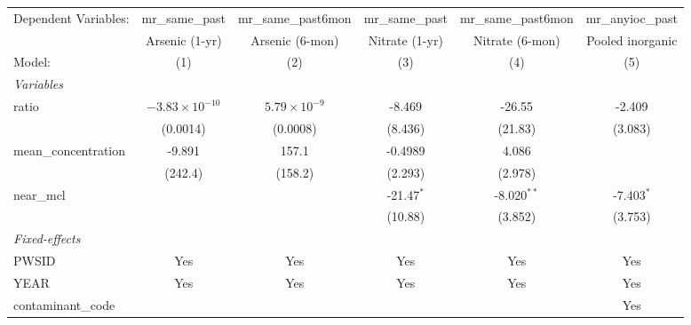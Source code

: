 \makeatletter
{}%
\makeatother

\begingroup
\centering
\begin{tabular}{lccccc}
   \tabularnewline \midrule \midrule
   Dependent Variables: & mr\_same\_past          & mr\_same\_past6mon    & mr\_same\_past   & mr\_same\_past6mon   & mr\_anyioc\_past\\    
                        & Arsenic (1-yr)          & Arsenic (6-mon)       & Nitrate (1-yr)   & Nitrate (6-mon)      & Pooled inorganic \\   
   Model:               & (1)                     & (2)                   & (3)              & (4)                  & (5)\\  
   \midrule
   \emph{Variables}\\
   ratio                & $-3.83\times 10^{-10}$  & $5.79\times 10^{-9}$  & -8.469           & -26.55               & -2.409\\   
                        & (0.0014)                & (0.0008)              & (8.436)          & (21.83)              & (3.083)\\   
   mean\_concentration  & -9.891                  & 157.1                 & -0.4989          & 4.086                &   \\   
                        & (242.4)                 & (158.2)               & (2.293)          & (2.978)              &   \\   
   near\_mcl            &                         &                       & -21.47$^{*}$     & -8.020$^{**}$        & -7.403$^{*}$\\   
                        &                         &                       & (10.88)          & (3.852)              & (3.753)\\   
   \midrule
   \emph{Fixed-effects}\\
   PWSID                & Yes                     & Yes                   & Yes              & Yes                  & Yes\\  
   YEAR                 & Yes                     & Yes                   & Yes              & Yes                  & Yes\\  
   contaminant\_code    &                         &                       &                  &                      & Yes\\  

\end{tabular}
